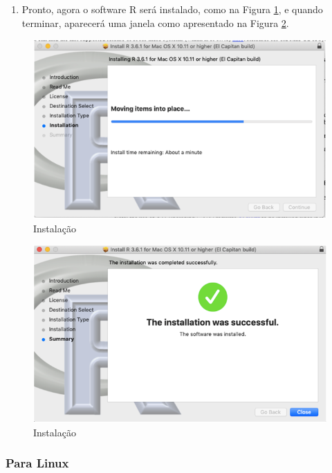 \documentclass[
]{book}
\providecommand{\tightlist}{%
  \setlength{\itemsep}{0pt}\setlength{\parskip}{0pt}}
\begin{document}
\begin{enumerate}
\def\labelenumi{\arabic{enumi})}
\setcounter{enumi}{7}
\tightlist
\item
  Pronto, agora o software R será instalado, como na Figura \ref{fig:mac9}, e quando terminar, aparecerá uma janela como apresentado na Figura \ref{fig:mac10}.
\end{enumerate}

\begin{figure}
\includegraphics[width=1\linewidth]{figures/mac_R_9} \caption{\label{fig:mac9} Instalação}\label{fig:mac9}
\end{figure}

\begin{figure}
\includegraphics[width=1\linewidth]{figures/mac_R_10} \caption{\label{fig:mac10} Instalação}\label{fig:mac10}
\end{figure}

\hypertarget{para-linux}{%
\subsubsection{Para Linux}\label{para-linux}}
\end{document}
